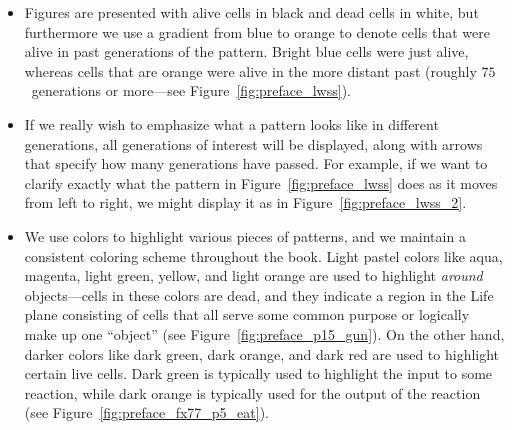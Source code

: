 \begin{itemize}
	\item Figures are presented with alive cells in black and dead cells in white, but furthermore we use a gradient from blue to orange to denote cells that were alive in past generations of the pattern. Bright blue cells were just alive, whereas cells that are orange were alive in the more distant past (roughly $75$~generations or more---see Figure~\ref{fig:preface_lwss}).\bigskip

	\noindent\begin{minipage}{\linewidth}
		\centering{}
		\label{fig:preface_lwss}\bigskip
	\end{minipage}
	
	\item If we really wish to emphasize what a pattern looks like in different generations, all generations of interest will be displayed, along with arrows that specify how many generations have passed. For example, if we want to clarify exactly what the pattern in Figure~\ref{fig:preface_lwss} does as it moves from left to right, we might display it as in Figure~\ref{fig:preface_lwss_2}.\bigskip
	
	\noindent\begin{minipage}{\linewidth}
		\centering{}
		\label{fig:preface_lwss_2}\bigskip
	\end{minipage}

	\item We use colors to highlight various pieces of patterns, and we maintain a consistent coloring scheme throughout the book. Light pastel colors like aqua, magenta, light green, yellow, and light orange are used to highlight \emph{around} objects---cells in these colors are dead, and they indicate a region in the Life plane consisting of cells that all serve some common purpose or logically make up one ``object'' (see Figure~\ref{fig:preface_p15_gun}). On the other hand, darker colors like dark green, dark orange, and dark red are used to highlight certain live cells. Dark green is typically used to highlight the input to some reaction, while dark orange is typically used for the output of the reaction (see Figure~\ref{fig:preface_fx77_p5_eat}).\bigskip
	

\end{itemize}
